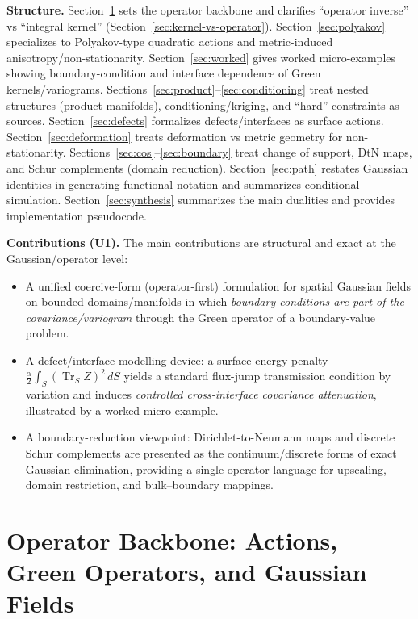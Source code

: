 \documentclass[11pt]{article}
\theoremstyle{definition}
\theoremstyle{plain}
\theoremstyle{remark}
\newcommand{\trS}{\operatorname{Tr}_{S}}
\begin{document}
\medskip
\noindent\textbf{Structure.}
Section~\ref{sec:framework} sets the operator backbone and clarifies ``operator inverse'' vs ``integral kernel'' (Section~\ref{sec:kernel-vs-operator}).
Section~\ref{sec:polyakov} specializes to Polyakov-type quadratic actions and metric-induced anisotropy/non-stationarity.
Section~\ref{sec:worked} gives worked micro-examples showing boundary-condition and interface dependence of Green kernels/variograms.
Sections~\ref{sec:product}--\ref{sec:conditioning} treat nested structures (product manifolds), conditioning/kriging, and ``hard'' constraints as sources.
Section~\ref{sec:defects} formalizes defects/interfaces as surface actions.
Section~\ref{sec:deformation} treats deformation vs metric geometry for non-stationarity.
Sections~\ref{sec:cos}--\ref{sec:boundary} treat change of support, DtN maps, and Schur complements (domain reduction).
Section~\ref{sec:path} restates Gaussian identities in generating-functional notation and summarizes conditional simulation.
Section~\ref{sec:synthesis} summarizes the main dualities and provides implementation pseudocode.

\medskip
\noindent\textbf{Contributions (U1).}
The main contributions are structural and exact at the Gaussian/operator level:
\begin{itemize}[leftmargin=2em]
\item[(C1)] A unified coercive-form (operator-first) formulation for spatial Gaussian fields on bounded domains/manifolds in which \emph{boundary conditions are part of the covariance/variogram} through the Green operator of a boundary-value problem.
\item[(C2)] A defect/interface modelling device: a surface energy penalty $\frac{\alpha}{2}\int_S (\trS Z)^2\,dS$ yields a standard flux-jump transmission condition by variation and induces \emph{controlled cross-interface covariance attenuation}, illustrated by a worked micro-example.
\item[(C3)] A boundary-reduction viewpoint: Dirichlet-to-Neumann maps and discrete Schur complements are presented as the continuum/discrete forms of exact Gaussian elimination, providing a single operator language for upscaling, domain restriction, and bulk--boundary mappings.
\end{itemize}


\section{Operator Backbone: Actions, Green Operators, and Gaussian Fields}\label{sec:framework}
\end{document}
